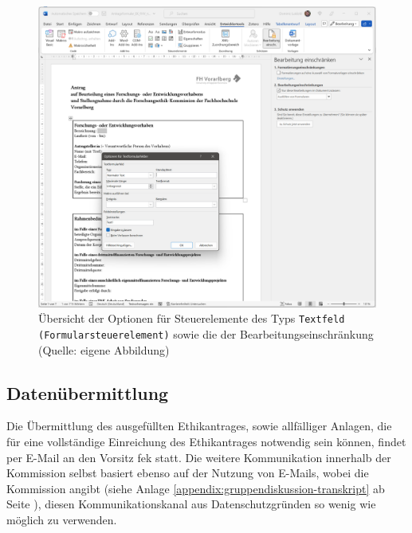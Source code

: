 \documentclass[a4paper,12pt,twoside]{scrreprt}
\begin{document}
\begin{figure}[ht]
    \centering
    \includegraphics[width=\linewidth]{thesis/images/Luidold_Word-Vorlage-FHV-Textformularfeld.png}
    \caption[Übersicht der Optionen für Steuerelemente des Typs \texttt{Textfeld (Formularsteuerelement)} sowie die der Bearbeitungseinschränkung]{Übersicht der Optionen für Steuerelemente des Typs \texttt{Textfeld (Formularsteuerelement)} sowie die der Bearbeitungseinschränkung (Quelle: eigene Abbildung)}
    \label{fig:optionen-textformularfeld-bearbeitungsmöglichkeiten}
\end{figure}

\subsection{Datenübermittlung}
\label{sub-sec:datenübermittlung}

Die Übermittlung des ausgefüllten Ethikantrages, sowie allfälliger Anlagen, die für eine vollständige Einreichung des Ethikantrages notwendig sein können, findet per E-Mail an den Vorsitz \ac{fek} statt. \cite{fachhochschule_vorarlberg_gmbh_forschungsethik-kommission_2021} Die weitere Kommunikation innerhalb der Kommission selbst basiert ebenso auf der Nutzung von E-Mails, wobei die Kommission angibt (siehe Anlage \ref{appendix:gruppendiskussion-transkript} ab Seite \pageref{appendix:gruppendiskussion-transkript}), diesen Kommunikationskanal aus Datenschutzgründen so wenig wie möglich zu verwenden.
\end{document}
